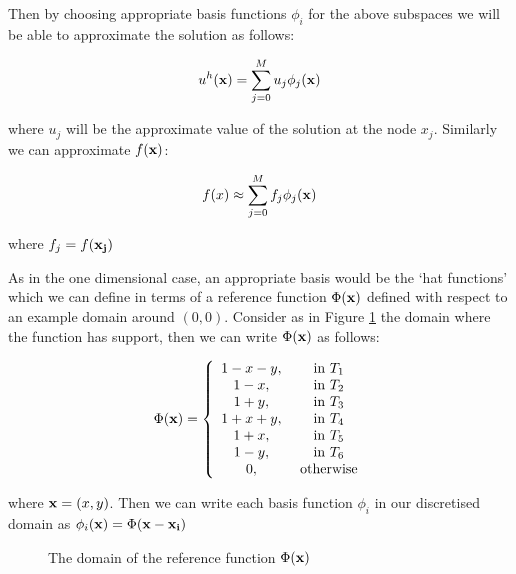 Then by choosing appropriate basis functions $\phi_i$ for the above subspaces
we will be able to approximate the solution as follows:

\begin{equation}
    u^h(\mathbf{x}) = \sum_{j=0}^Mu_j\phi_j(\mathbf{x})
\end{equation}

where $u_j$ will be the approximate value of the solution at the node $x_j$.
Similarly we can approximate $f(\mathbf{x})$:

\begin{equation}
    f(x) \approx \sum_{j=0}^Mf_j\phi_j(\mathbf{x})
\end{equation}

where $f_j = f(\mathbf{x_j})$


As in the one dimensional case, an appropriate basis would be the `hat
functions' which we can define in terms of a reference function $\Phi(\mathbf{x})$
defined with respect to an example domain around $(0,0)$.  Consider as in
Figure \ref{fig:reference-function-domain} the domain where the function has
support, then we can write $\Phi(\mathbf{x})$ as follows:

\begin{equation}\label{eq:two-d-ref-basis-fn}
    \Phi(\mathbf{x}) = \left\{\begin{array}{c c}
                    1 - x - y, & \text{ in } T_1 \\
                    1 - x,       & \text{ in } T_2 \\
                    1 + y,       & \text{ in } T_3 \\
                    1 + x + y,   & \text{ in } T_4 \\
                    1 + x,       & \text{ in } T_5 \\
                    1 - y,       & \text{ in } T_6 \\
                    0,           & \text{ otherwise}
                  \end{array}\right.
\end{equation}

where $\mathbf{x} = (x, y)$. Then we can write each basis function $\phi_i$ in our
discretised domain as $\phi_i(\mathbf{x}) = \Phi(\mathbf{x} - \mathbf{x_i})$

\begin{figure}
\centering

\caption{The domain of the reference function $\Phi(\mathbf{x})$}
\label{fig:reference-function-domain}
\end{figure}

